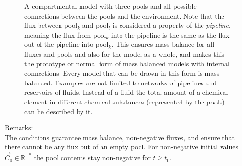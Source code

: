 \documentclass[a4paper]{article}
\DeclareRobustCommand{\Rbb}[1]{
		\mathbb{R}^{+^{#1}}
}
\DeclareRobustCommand{\Rbb}[1]{
		\mathbb{R}^{+^{#1}}
}
\begin{document}
\begin{appendices}
\begin{figure}[h]
	\caption{
     	\label{fig:3PoolsFeedBackWaterM}
	A compartmental model with three pools and all possible
	connections between the pools and the environment.  
	Note that the flux between pool$_k$ and pool$_l$ is considered a property of the
	\emph{pipeline}, meaning the flux from pool$_k$ into the pipeline is the
	same as the flux out of the pipeline into pool$_k$.  
	This ensures mass balance for all fluxes and pools and also for the model as a whole, and
	makes this the prototype or normal form of mass balanced models with
	internal connections.  
	Every model that can be drawn in this
	form is mass balanced.  Examples are not limited to networks of
	pipelines and reservoirs of fluids. Instead of a fluid the total amount
	of a chemical element in different chemical substances (represented by
	the pools) can be described by it.
	}
\end{figure}
Remarks:\\
The conditions guarantee mass balance, non-negative fluxes,
and ensure that there cannot be any flux out of an empty pool.
For non-negative initial values $\vec{C}_0\in \Rbb{n}$ the pool contents stay non-negative for  $t\ge t_0$.
\end{appendices}



\end{document}
